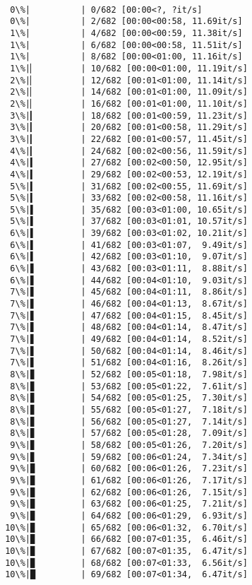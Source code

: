 \documentclass[11pt]{article}
\begin{document}
    \begin{Verbatim}[commandchars=\\\{\}]

  0\%|          | 0/682 [00:00<?, ?it/s]
  0\%|          | 2/682 [00:00<00:58, 11.69it/s]
  1\%|          | 4/682 [00:00<00:59, 11.38it/s]
  1\%|          | 6/682 [00:00<00:58, 11.51it/s]
  1\%|          | 8/682 [00:00<01:00, 11.16it/s]
  1\%|▏         | 10/682 [00:00<01:00, 11.19it/s]
  2\%|▏         | 12/682 [00:01<01:00, 11.14it/s]
  2\%|▏         | 14/682 [00:01<01:00, 11.09it/s]
  2\%|▏         | 16/682 [00:01<01:00, 11.10it/s]
  3\%|▎         | 18/682 [00:01<00:59, 11.23it/s]
  3\%|▎         | 20/682 [00:01<00:58, 11.29it/s]
  3\%|▎         | 22/682 [00:01<00:57, 11.45it/s]
  4\%|▎         | 24/682 [00:02<00:56, 11.59it/s]
  4\%|▍         | 27/682 [00:02<00:50, 12.95it/s]
  4\%|▍         | 29/682 [00:02<00:53, 12.19it/s]
  5\%|▍         | 31/682 [00:02<00:55, 11.69it/s]
  5\%|▍         | 33/682 [00:02<00:58, 11.16it/s]
  5\%|▌         | 35/682 [00:03<01:00, 10.65it/s]
  5\%|▌         | 37/682 [00:03<01:01, 10.57it/s]
  6\%|▌         | 39/682 [00:03<01:02, 10.21it/s]
  6\%|▌         | 41/682 [00:03<01:07,  9.49it/s]
  6\%|▌         | 42/682 [00:03<01:10,  9.07it/s]
  6\%|▋         | 43/682 [00:03<01:11,  8.88it/s]
  6\%|▋         | 44/682 [00:04<01:10,  9.03it/s]
  7\%|▋         | 45/682 [00:04<01:11,  8.86it/s]
  7\%|▋         | 46/682 [00:04<01:13,  8.67it/s]
  7\%|▋         | 47/682 [00:04<01:15,  8.45it/s]
  7\%|▋         | 48/682 [00:04<01:14,  8.47it/s]
  7\%|▋         | 49/682 [00:04<01:14,  8.52it/s]
  7\%|▋         | 50/682 [00:04<01:14,  8.46it/s]
  7\%|▋         | 51/682 [00:04<01:16,  8.26it/s]
  8\%|▊         | 52/682 [00:05<01:18,  7.98it/s]
  8\%|▊         | 53/682 [00:05<01:22,  7.61it/s]
  8\%|▊         | 54/682 [00:05<01:25,  7.30it/s]
  8\%|▊         | 55/682 [00:05<01:27,  7.18it/s]
  8\%|▊         | 56/682 [00:05<01:27,  7.14it/s]
  8\%|▊         | 57/682 [00:05<01:28,  7.09it/s]
  9\%|▊         | 58/682 [00:05<01:26,  7.20it/s]
  9\%|▊         | 59/682 [00:06<01:24,  7.34it/s]
  9\%|▉         | 60/682 [00:06<01:26,  7.23it/s]
  9\%|▉         | 61/682 [00:06<01:26,  7.17it/s]
  9\%|▉         | 62/682 [00:06<01:26,  7.15it/s]
  9\%|▉         | 63/682 [00:06<01:25,  7.21it/s]
  9\%|▉         | 64/682 [00:06<01:29,  6.93it/s]
 10\%|▉         | 65/682 [00:06<01:32,  6.70it/s]
 10\%|▉         | 66/682 [00:07<01:35,  6.46it/s]
 10\%|▉         | 67/682 [00:07<01:35,  6.47it/s]
 10\%|▉         | 68/682 [00:07<01:33,  6.56it/s]
 10\%|█         | 69/682 [00:07<01:34,  6.47it/s]

\end{Verbatim}
\end{document}
